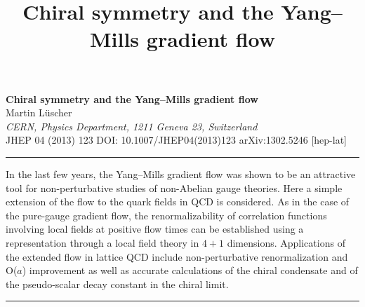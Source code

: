 \documentclass[11pt]{article}
\title{Chiral symmetry and the Yang--Mills gradient flow}
\author{}
\date{}
\begin{document}
\vspace{1.2cm}
\begin{center}
{\LARGE\bfseries Chiral symmetry and the Yang--Mills gradient flow}\\[1.2em]
{\large Martin L\"uscher}\\[0.8em]
{\itshape CERN, Physics Department, 1211 Geneva 23, Switzerland}\\[0.9em]
{\footnotesize JHEP 04 (2013) 123 \quad DOI: 10.1007/JHEP04(2013)123 \quad arXiv:1302.5246 [hep-lat]}
\end{center}
\vspace{0.8em}
\noindent\rule{\linewidth}{0.4pt}
\vspace{0.6em}

\quad
In the last few years,
the Yang--Mills gradient flow was shown to
be an attractive tool for non-perturbative studies
of non-Abelian gauge theories.
Here a simple extension of the
flow to the quark fields in QCD is considered.
As in the case of the pure-gauge gradient flow,
the renormalizability of correlation functions involving
local fields at positive flow times can be established
using a representation through a local field theory in
$4+1$ dimensions.
Applications of the extended flow in lattice QCD
include non-perturbative renormalization
and O($a$) improvement as well as
accurate calculations of the chiral condensate
and of the pseudo-scalar decay constant in the chiral limit.

\vspace{0.6em}
\noindent\rule{\linewidth}{0.4pt}
\vspace{1.2em}












\end{document}
